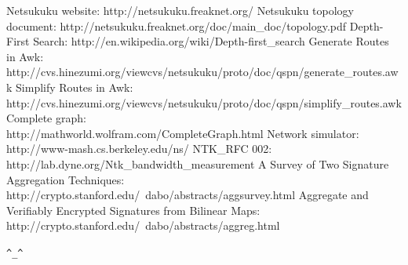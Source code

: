 \documentclass[a4paper]{article}
\newcommand{\href}[2]{ #1 }
\begin{document}
\begin{thebibliography}{99}
	 Netsukuku website:
		\href{http://netsukuku.freaknet.org/}{http://netsukuku.freaknet.org/}
	 Netsukuku topology document:
		\href{http://netsukuku.freaknet.org/doc/main\_doc/topology.pdf}{topology.pdf}
	 Depth-First Search:
		\href{http://en.wikipedia.org/wiki/Depth-first\_search}{http://en.wikipedia.org/wiki/Depth-first\_search}
	 Generate Routes in Awk:
		\ifpdf \else \\ \fi
		\href{http://cvs.hinezumi.org/viewcvs/netsukuku/proto/doc/qspn/generate\_routes.awk}{generate\_routes.awk}
	 Simplify Routes in Awk:
		\ifpdf \else \\ \fi
		\href{http://cvs.hinezumi.org/viewcvs/netsukuku/proto/doc/qspn/simplify\_routes.awk}{simplify\_routes.awk}
	 Complete graph:
		\ifpdf \else \\ \fi
		\href{http://mathworld.wolfram.com/CompleteGraph.html}{http://mathworld.wolfram.com/}
	 Network simulator:
		\ifpdf \else \\ \fi
		\href{http://www-mash.cs.berkeley.edu/ns/}{http://www-mash.cs.berkeley.edu/ns/}
	 NTK\_RFC 002:
		\href{http://lab.dyne.org/Ntk\_bandwidth\_measurement}{Bandwidth
		measurement}
	   A Survey of Two Signature Aggregation
		Techniques:
		\ifpdf \else \\ \fi
		\href{http://crypto.stanford.edu/~dabo/abstracts/aggsurvey.html}{http://crypto.stanford.edu/~dabo/abstracts/aggsurvey.html}
	  Aggregate and Verifiably Encrypted Signatures
		from Bilinear Maps:
		\ifpdf \else \\ \fi
		\href{http://crypto.stanford.edu/~dabo/abstracts/aggreg.html}{http://crypto.stanford.edu/~dabo/abstracts/aggreg.html}

\end{thebibliography}
\newpage

\begin{center}
\verb|^_^|
\end{center}
\end{document}
